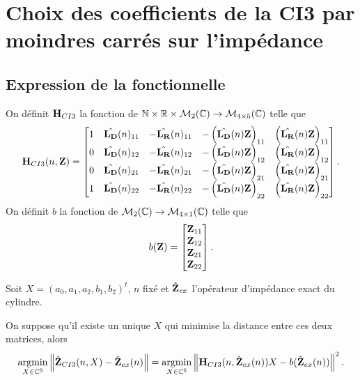 \section[Choix 1 du calcul des coefficients de la CI3]{Choix des coefficients de la CI3 par moindres carrés sur l'impédance}

  \subsection{Expression de la fonctionnelle}

    \begin{defn}
      On définit \(\mathbf{H}_{CI3}\) la fonction de \(\mathbb N \times \mathbb R \times \mathcal{M}_2(\mathbb C) \rightarrow \mathcal{M}_{4\times5}(\mathbb C)\) telle que
      \begin{equation*}
        \mathbf{H}_{CI3}(n,\mathbf{Z}) = \begin{bmatrix}
        1 & \hat{\mathbf{L_D}}(n)_{11} & -\hat{\mathbf{L_R}}(n)_{11} & -\left(\hat{\mathbf{L_D}}(n){\mathbf{Z}}\right)_{11} & \left(\hat{\mathbf{L_R}}(n){\mathbf{Z}}\right)_{11}
        \\
        0 & \hat{\mathbf{L_D}}(n)_{12} & -\hat{\mathbf{L_R}}(n)_{12} & -\left(\hat{\mathbf{L_D}}(n){\mathbf{Z}}\right)_{12} & \left(\hat{\mathbf{L_R}}(n){\mathbf{Z}}\right)_{12}
        \\
        0 & \hat{\mathbf{L_D}}(n)_{21} & -\hat{\mathbf{L_R}}(n)_{21} & -\left(\hat{\mathbf{L_D}}(n){\mathbf{Z}}\right)_{21} & \left(\hat{\mathbf{L_R}}(n){\mathbf{Z}}\right)_{21}
        \\
        1 & \hat{\mathbf{L_D}}(n)_{22} & -\hat{\mathbf{L_R}}(n)_{22} & -\left(\hat{\mathbf{L_D}}(n){\mathbf{Z}}\right)_{22} & \left(\hat{\mathbf{L_R}}(n){\mathbf{Z}}\right)_{22}
        \end{bmatrix}.
      \end{equation*}
      On définit \(b\) la fonction de \(\mathcal{M}_2(\mathbb C) \rightarrow \mathcal{M}_{4\times1}(\mathbb C)\) telle que
      \begin{equation*}
        b(\mathbf{Z}) = \begin{bmatrix}
        {\mathbf{Z}}_{11}
        \\
        {\mathbf{Z}}_{12}
        \\
        {\mathbf{Z}}_{21}
        \\
        {\mathbf{Z}}_{22}
        \end{bmatrix}.
      \end{equation*}
    \end{defn}

    \begin{prop}
      Soit \(X = (a_0,a_1,a_2,b_1,b_2)^t\), \(n\) fixé et \(\hat{\mathbf{Z}}_{ex}\) l'opérateur d'impédance exact du cylindre.

      On suppose qu'il existe un unique \(X\) qui minimise la distance entre ces deux matrices, alors
      \begin{equation*}
        {\underset{X\in\mathbb C^5}{\operatorname{argmin}}} \left\lVert\hat{\mathbf{Z}}_{CI3}(n,X) - \hat{\mathbf{Z}}_{ex}(n)\right\rVert = {\underset{X\in\mathbb C^5}{\operatorname{argmin}}} \left\lVert\mathbf{H}_{CI3}(n,\hat{\mathbf{Z}}_{ex}(n))X - b(\hat{\mathbf{Z}}_{ex}(n))\right\rVert^2.
      \end{equation*}
    \end{prop}


